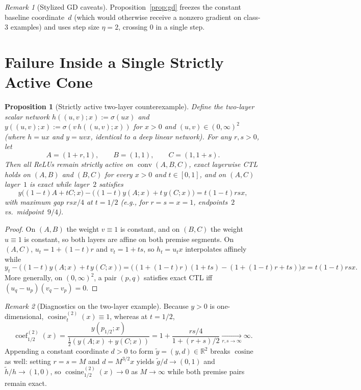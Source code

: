 \documentclass[11pt]{article}
\theoremstyle{plain}
\newtheorem{proposition}[theorem]{Proposition}
\theoremstyle{definition}
\theoremstyle{remark}
\newtheorem{remark}{Remark}
\DeclareMathOperator{\conv}{conv}
\DeclareMathOperator{\cosine}{cosine}
\DeclareMathOperator{\coef}{coef}
\begin{document}
\begin{remark}[Stylized GD caveats]
Proposition~\ref{prop:gd} freezes the constant baseline coordinate~$d$ (which would otherwise receive a nonzero gradient on class-$3$ examples) and uses step size $\eta = 2$, crossing $0$ in a single step.
\end{remark}

\section{Failure Inside a Single Strictly Active Cone}

\begin{proposition}[Strictly active two-layer counterexample]\label{prop:two-layer}
Define the two-layer scalar network $h((u, v); x) := \sigma(ux)$ and $y((u, v); x) := \sigma(v\,h((u, v); x))$ for $x > 0$ and $(u, v) \in (0, \infty)^2$ (where $h = ux$ and $y = uvx$, identical to a deep linear network). For any $r, s > 0$, let
\[
A = (1 + r, 1), \qquad B = (1, 1), \qquad C = (1, 1 + s).
\]
Then all ReLUs remain strictly active on $\conv(A, B, C)$, exact layerwise CTL holds on $(A, B)$ and $(B, C)$ for every $x > 0$ and $t \in [0, 1]$, and on $(A, C)$ layer~$1$ is exact while layer~$2$ satisfies
\[
y\bigl((1 - t)A + tC; x\bigr) - \bigl((1 - t)y(A; x) + t\,y(C; x)\bigr) = t(1 - t)rsx,
\]
with maximum gap $rsx/4$ at $t = 1/2$ (e.g., for $r = s = x = 1$, endpoints~$2$ vs.\ midpoint~$9/4$).
\end{proposition}

\begin{proof}
On $(A, B)$ the weight $v \equiv 1$ is constant, and on $(B, C)$ the weight $u \equiv 1$ is constant, so both layers are affine on both premise segments. On $(A, C)$, $u_t = 1 + (1 - t)r$ and $v_t = 1 + ts$, so $h_t = u_t x$ interpolates affinely while
\[
y_t - \bigl((1 - t)y(A; x) + t\,y(C; x)\bigr)
= \bigl((1 + (1 - t)r)(1 + ts) - (1 + (1 - t)r + ts)\bigr)x
= t(1 - t)rsx.
\]
More generally, on $(0, \infty)^2$, a pair $(p, q)$ satisfies exact CTL iff $(u_q - u_p)(v_q - v_p) = 0$.
\end{proof}

\begin{remark}[Diagnostics on the two-layer example]
Because $y > 0$ is one-dimensional, $\cosine_t^{(2)}(x) \equiv 1$, whereas at $t = 1/2$,
\[
\coef_{1/2}^{(2)}(x) = \frac{y(p_{1/2}; x)}{\frac{1}{2}(y(A; x) + y(C; x))} = 1 + \frac{rs/4}{1 + (r + s)/2} \xrightarrow[r, s \to \infty]{} \infty.
\]
Appending a constant coordinate $d > 0$ to form $\tilde{y} = (y, d) \in \mathbb{R}^2$ breaks $\cosine$ as well: setting $r = s = M$ and $d = M^{3/2}x$ yields $\tilde{g}/d \to (0, 1)$ and $\tilde{h}/h \to (1, 0)$, so $\cosine_{1/2}^{(2)}(x) \to 0$ as $M \to \infty$ while both premise pairs remain exact.
\end{remark}
\end{document}

